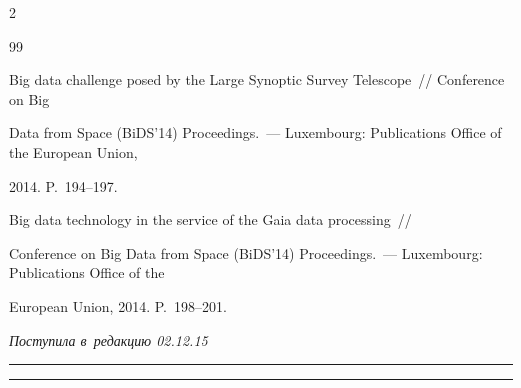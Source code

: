 \begin{multicols}{2}
{{\begin{thebibliography}{99}


 Big data challenge posed by the Large Synoptic Survey Telescope~//  Conference on Big 


Data from Space (BiDS'14) Proceedings.~--- Luxembourg: Publications Office of the European Union, 


2014. P.~194--197.




 Big data technology in the service of the Gaia data processing~//  


Conference on Big Data from Space (BiDS'14) Proceedings.~--- Luxembourg: Publications Office of the 


European Union, 2014. P.~198--201.


\end{thebibliography}





 }


 }





\end{multicols}





\vspace*{-3pt}





\hfill{\small\textit{Поступила в~редакцию 02.12.15}}





\vspace*{8pt}















\hrule





\vspace*{2pt}





\hrule





